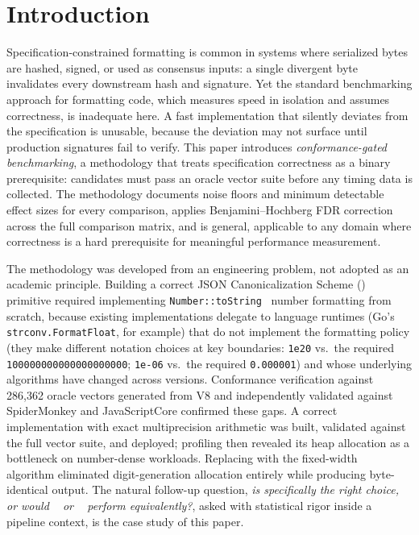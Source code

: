 \section{Introduction}
\label{sec:introduction}

Specification-constrained formatting is common in systems where
serialized bytes are hashed, signed, or used as consensus inputs:
a single divergent byte invalidates every downstream hash and
signature.  Yet the standard benchmarking approach for formatting
code, which measures speed in isolation and assumes correctness, is
inadequate here.  A fast implementation that silently deviates from
the specification is unusable, because the
deviation may not surface until production signatures fail to verify.
This paper introduces \emph{conformance-gated benchmarking}, a
methodology that treats specification correctness as a binary
prerequisite: candidates must pass an oracle vector suite before any
timing data is collected.  The methodology documents noise floors and
minimum detectable effect sizes for every comparison, applies
Benjamini--Hochberg FDR correction across the full comparison matrix,
and is general, applicable to any domain where correctness is a hard
prerequisite for meaningful performance measurement.

The methodology was developed from an engineering problem, not adopted
as an academic principle.  Building a correct JSON Canonicalization
Scheme (\rfcjcs)~\cite{rfc8785} primitive required implementing
\ecma \texttt{Number::toString}~\cite{ecma262} number formatting from
scratch, because existing \rfcjcs implementations delegate to language
runtimes (Go's \texttt{strconv.FormatFloat}, for example) that do
not implement the \ecma formatting policy (they make different notation
choices at key boundaries: \texttt{1e20} vs.\ the required
\texttt{100000000000000000000}; \texttt{1e-06} vs.\ the required
\texttt{0.000001}) and whose underlying algorithms have changed across
versions.  Conformance verification against 286{,}362 oracle vectors
generated from V8 and independently validated against SpiderMonkey and
JavaScriptCore confirmed these gaps.  A correct \burgerdybvig~\cite{burger1996printing}
implementation with exact multiprecision arithmetic was built, validated
against the full vector suite, and deployed; profiling then revealed
its heap allocation as a bottleneck on number-dense workloads.
Replacing \burgerdybvig with the fixed-width
\schubfach~\cite{giulietti2022schubfach} algorithm eliminated
digit-generation allocation entirely while producing byte-identical
output.  The natural follow-up question, \emph{is \schubfach
specifically the right choice, or would \ryualg~\cite{adams2018ryu} or
\dragonbox~\cite{jeon2021dragonbox} perform equivalently?}, asked with
statistical rigor inside a pipeline context, is the case study of this
paper.

